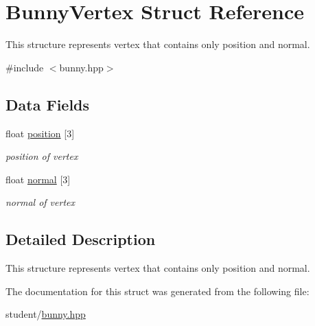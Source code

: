 \hypertarget{structBunnyVertex}{}\section{Bunny\+Vertex Struct Reference}
\label{structBunnyVertex}


This structure represents vertex that contains only position and normal.  




{\ttfamily \#include $<$bunny.\+hpp$>$}

\subsection*{Data Fields}
\begin{DoxyCompactItemize}
\item 
\mbox{\label{structBunnyVertex_a2d228a475dea955ec6c696ee545ac731}} 
float \hyperlink{structBunnyVertex_a2d228a475dea955ec6c696ee545ac731}{position} \mbox{[}3\mbox{]}
\begin{DoxyCompactList}\small\item\em position of vertex \end{DoxyCompactList}\item 
\mbox{\label{structBunnyVertex_aa7f67904a835c896f368dd2e37cc46db}} 
float \hyperlink{structBunnyVertex_aa7f67904a835c896f368dd2e37cc46db}{normal} \mbox{[}3\mbox{]}
\begin{DoxyCompactList}\small\item\em normal of vertex \end{DoxyCompactList}\end{DoxyCompactItemize}


\subsection{Detailed Description}
This structure represents vertex that contains only position and normal. 

The documentation for this struct was generated from the following file\+:\begin{DoxyCompactItemize}
\item 
student/\hyperlink{bunny_8hpp}{bunny.\+hpp}\end{DoxyCompactItemize}
